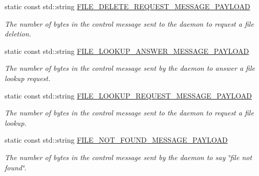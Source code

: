 \begin{DoxyCompactItemize}
static const std\+::string \hyperlink{classwrench_1_1_storage_service_message_payload_ac7a4513d5bd196e1aa345ade9d4863f7}{F\+I\+L\+E\+\_\+\+D\+E\+L\+E\+T\+E\+\_\+\+R\+E\+Q\+U\+E\+S\+T\+\_\+\+M\+E\+S\+S\+A\+G\+E\+\_\+\+P\+A\+Y\+L\+O\+AD}
\begin{DoxyCompactList}\small\item\em The number of bytes in the control message sent to the daemon to request a file deletion. \end{DoxyCompactList}\item 
\mbox{\label{classwrench_1_1_storage_service_message_payload_a6275d2b1258e3b4f2e32debb397b8176}} 
static const std\+::string \hyperlink{classwrench_1_1_storage_service_message_payload_a6275d2b1258e3b4f2e32debb397b8176}{F\+I\+L\+E\+\_\+\+L\+O\+O\+K\+U\+P\+\_\+\+A\+N\+S\+W\+E\+R\+\_\+\+M\+E\+S\+S\+A\+G\+E\+\_\+\+P\+A\+Y\+L\+O\+AD}
\begin{DoxyCompactList}\small\item\em The number of bytes in the control message sent by the daemon to answer a file lookup request. \end{DoxyCompactList}\item 
\mbox{\label{classwrench_1_1_storage_service_message_payload_aa97372689faf8b722d2ae64d2b0975ff}} 
static const std\+::string \hyperlink{classwrench_1_1_storage_service_message_payload_aa97372689faf8b722d2ae64d2b0975ff}{F\+I\+L\+E\+\_\+\+L\+O\+O\+K\+U\+P\+\_\+\+R\+E\+Q\+U\+E\+S\+T\+\_\+\+M\+E\+S\+S\+A\+G\+E\+\_\+\+P\+A\+Y\+L\+O\+AD}
\begin{DoxyCompactList}\small\item\em The number of bytes in the control message sent to the daemon to request a file lookup. \end{DoxyCompactList}\item 
\mbox{\label{classwrench_1_1_storage_service_message_payload_a6cd1f30e820f59c97b82d8be2de399be}} 
static const std\+::string \hyperlink{classwrench_1_1_storage_service_message_payload_a6cd1f30e820f59c97b82d8be2de399be}{F\+I\+L\+E\+\_\+\+N\+O\+T\+\_\+\+F\+O\+U\+N\+D\+\_\+\+M\+E\+S\+S\+A\+G\+E\+\_\+\+P\+A\+Y\+L\+O\+AD}
\begin{DoxyCompactList}\small\item\em The number of bytes in the control message sent by the daemon to say \char`\"{}file not found\char`\"{}. \end{DoxyCompactList}\item 

\end{DoxyCompactItemize}
